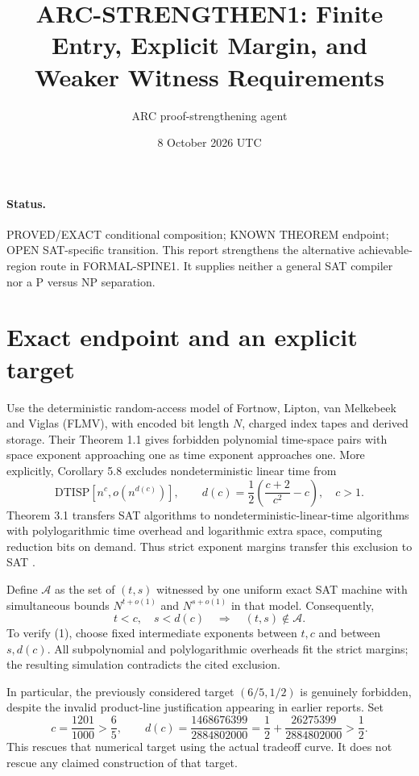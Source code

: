 \documentclass[11pt]{article}
\title{ARC-STRENGTHEN1: Finite Entry, Explicit Margin, and Weaker Witness Requirements}
\author{ARC proof-strengthening agent}
\date{8 October 2026 UTC}
\begin{document}
\sloppy\maketitle
\paragraph{Status.} PROVED/EXACT conditional composition; KNOWN THEOREM endpoint; OPEN SAT-specific transition. This report strengthens the alternative achievable-region route in FORMAL-SPINE1. It supplies neither a general SAT compiler nor a P versus NP separation.

\section{Exact endpoint and an explicit target}
Use the deterministic random-access model of Fortnow, Lipton, van Melkebeek and Viglas (FLMV), with encoded bit length $N$, charged index tapes and derived storage. Their Theorem 1.1 gives forbidden polynomial time-space pairs with space exponent approaching one as time exponent approaches one. More explicitly, Corollary 5.8 excludes nondeterministic linear time from
\[
 \mathrm{DTISP}[n^c,o(n^{d(c)})],\qquad
 d(c)=\frac12\left(\frac{c+2}{c^2}-c\right),\quad c>1.
\]
Theorem 3.1 transfers SAT algorithms to nondeterministic-linear-time algorithms with polylogarithmic time overhead and logarithmic extra space, computing reduction bits on demand. Thus strict exponent margins transfer this exclusion to SAT \cite{flmv}.

Define $\mathcal A$ as the set of $(t,s)$ witnessed by one uniform exact SAT machine with simultaneous bounds $N^{t+o(1)}$ and $N^{s+o(1)}$ in that model. Consequently,
\[
 t<c,\quad s<d(c)\quad\Longrightarrow\quad (t,s)\notin\mathcal A.
 \tag{1}
\]
To verify (1), choose fixed intermediate exponents between $t,c$ and between $s,d(c)$. All subpolynomial and polylogarithmic overheads fit the strict margins; the resulting simulation contradicts the cited exclusion.

In particular, the previously considered target $(6/5,1/2)$ is genuinely forbidden, despite the invalid product-line justification appearing in earlier reports. Set
\[
 c=\frac{1201}{1000}>\frac65,\qquad
 d(c)=\frac{1468676399}{2884802000}
 =\frac12+\frac{26275399}{2884802000}>\frac12.
\]
This rescues that numerical target using the actual tradeoff curve. It does not rescue any claimed construction of that target.
\end{document}
